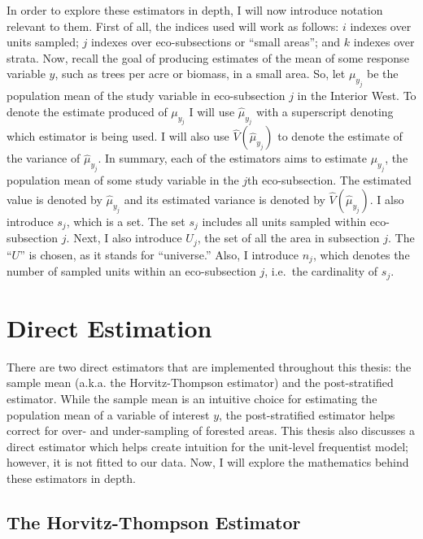 \documentclass[12pt,twoside]{reedthesis}
\begin{document}
In order to explore these estimators in depth, I will now introduce notation relevant to them. First of all, the indices used will work as follows: \(i\) indexes over units sampled; \(j\) indexes over eco-subsections or ``small areas''; and \(k\) indexes over strata. Now, recall the goal of producing estimates of the mean of some response variable \(y\), such as trees per acre or biomass, in a small area. So, let \(\mu_{y_j}\) be the population mean of the study variable in eco-subsection \(j\) in the Interior West. To denote the estimate produced of \(\mu_{y_j}\) I will use \(\hat\mu_{y_j}\) with a superscript denoting which estimator is being used. I will also use \(\hat V(\hat\mu_{y_j})\) to denote the estimate of the variance of \(\hat\mu_{y_j}\). In summary, each of the estimators aims to estimate \(\mu_{y_j}\), the population mean of some study variable in the \(j\)th eco-subsection. The estimated value is denoted by \(\hat\mu_{y_j}\) and its estimated variance is denoted by \(\hat V(\hat\mu_{y_j})\). I also introduce \(s_j\), which is a set. The set \(s_j\) includes all units sampled within eco-subsection \(j\). Next, I also introduce \(U_j\), the set of all the area in subsection \(j\). The ``\(U\)'' is chosen, as it stands for ``universe.'' Also, I introduce \(n_j\), which denotes the number of sampled units within an eco-subsection \(j\), i.e.~the cardinality of \(s_j\).

\hypertarget{direct-estimation}{%
\section{Direct Estimation}\label{direct-estimation}}

There are two direct estimators that are implemented throughout this thesis: the sample mean (a.k.a. the Horvitz-Thompson estimator) and the post-stratified estimator. While the sample mean is an intuitive choice for estimating the population mean of a variable of interest \(y\), the post-stratified estimator helps correct for over- and under-sampling of forested areas. This thesis also discusses a direct estimator which helps create intuition for the unit-level frequentist model; however, it is not fitted to our data. Now, I will explore the mathematics behind these estimators in depth.

\hypertarget{the-horvitz-thompson-estimator}{%
\subsection{The Horvitz-Thompson Estimator}\label{the-horvitz-thompson-estimator}}
\end{document}
